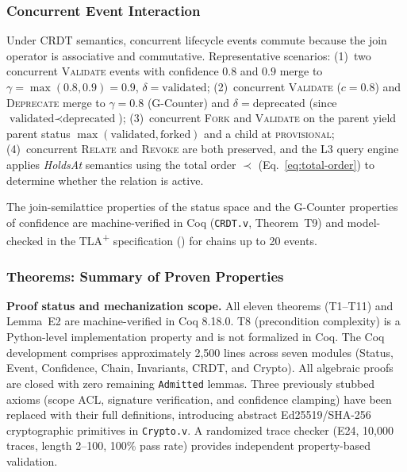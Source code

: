 \subsubsection{Concurrent Event Interaction}\label{subsubsec:concurrent-events}

Under CRDT semantics, concurrent lifecycle events commute because the join operator is associative and commutative. Representative scenarios: (1)~two concurrent \textsc{Validate} events with confidence $0.8$ and $0.9$ merge to $\gamma = \max(0.8,0.9) = 0.9$, $\delta = \text{validated}$; (2)~concurrent \textsc{Validate} ($c=0.8$) and \textsc{Deprecate} merge to $\gamma = 0.8$ (G-Counter) and $\delta = \text{deprecated}$ (since $\text{validated} \prec \text{deprecated}$); (3)~concurrent \textsc{Fork} and \textsc{Validate} on the parent yield parent status $\max(\text{validated}, \text{forked})$ and a child at \textsc{provisional}; (4)~concurrent \textsc{Relate} and \textsc{Revoke} are both preserved, and the L3 query engine applies \emph{HoldsAt} semantics using the total order $\prec$ (Eq.~\ref{eq:total-order}) to determine whether the relation is active.

The join-semilattice properties of the status space and the G-Counter properties of confidence are machine-verified in Coq (\texttt{CRDT.v}, Theorem~T9) and model-checked in the TLA\textsuperscript{+} specification () for chains up to 20 events.

\subsubsection{Theorems: Summary of Proven Properties}\label{subsubsec:theorems-summary}

\textbf{Proof status and mechanization scope.} All eleven theorems (T1--T11) and Lemma~E2 are machine-verified in Coq 8.18.0. T8 (precondition complexity) is a Python-level implementation property and is not formalized in Coq. The Coq development comprises approximately 2,500 lines across seven modules (Status, Event, Confidence, Chain, Invariants, CRDT, and Crypto). All algebraic proofs are closed with zero remaining \texttt{Admitted} lemmas. Three previously stubbed axioms (scope ACL, signature verification, and confidence clamping) have been replaced with their full definitions, introducing abstract Ed25519/SHA-256 cryptographic primitives in \texttt{Crypto.v}. A randomized trace checker (E24, 10,000 traces, length 2--100, 100\% pass rate) provides independent property-based validation.

